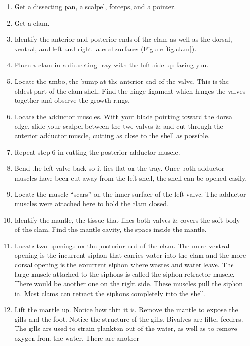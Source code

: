 \begin{enumerate}
\def\labelenumi{\arabic{enumi}.}
\tightlist
\item
  Get a dissecting pan, a scalpel, forceps, and a pointer.
\item
  Get a clam.
\item
  Identify the anterior and posterior ends of the clam as well as the
  dorsal, ventral, and left and right lateral surfaces (Figure
  \ref{fig:clam}).
\item
  Place a clam in a dissecting tray with the left side up facing you.
\item
  Locate the umbo, the bump at the anterior end of the valve. This is
  the oldest part of the clam shell. Find the hinge ligament which
  hinges the valves together and observe the growth rings.
\item
  Locate the adductor muscles. With your blade pointing toward the
  dorsal edge, slide your scalpel between the two valves \& and cut
  through the anterior adductor muscle, cutting as close to the shell as
  possible.
\item
  Repeat step 6 in cutting the posterior adductor muscle.
\item
  Bend the left valve back so it lies flat on the tray. Once both
  adductor muscles have been cut away from the left shell, the shell can
  be opened easily.
\item
  Locate the muscle ``scars'' on the inner surface of the left valve.
  The adductor muscles were attached here to hold the clam closed.
\item
  Identify the mantle, the tissue that lines both valves \& covers the
  soft body of the clam. Find the mantle cavity, the space inside the
  mantle.
\item
  Locate two openings on the posterior end of the clam. The more ventral
  opening is the incurrent siphon that carries water into the clam and
  the more dorsal opening is the excurrent siphon where wastes and water
  leave. The large muscle attached to the siphons is called the siphon
  retractor muscle. There would be another one on the right side. These
  muscles pull the siphon in. Most clams can retract the siphons
  completely into the shell.
\item
  Lift the mantle up. Notice how thin it is. Remove the mantle to expose
  the gills and the foot. Notice the structure of the gills. Bivalves
  are filter feeders. The gills are used to strain plankton out of the
  water, as well as to remove oxygen from the water. There are another

\end{enumerate}

